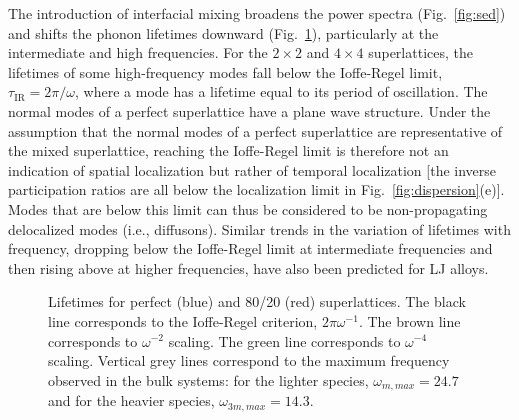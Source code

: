 \documentclass[aps,prb,preprint,preprintnumbers,amsmath,amssymb,floatfix,superscriptaddress]{revtex4}
\begin{document}
The introduction of interfacial mixing broadens the power spectra (Fig.~\ref{fig:sed}) and shifts the phonon lifetimes downward (Fig.~\ref{FIG:lifetime}), particularly at the intermediate and high frequencies. For the $2 \times 2$ and $ 4 \times 4$ superlattices,  the lifetimes of some high-frequency modes fall below the Ioffe-Regel limit, $\tau_\mathrm{IR} =2\pi/\omega$, where a mode has a lifetime equal to its period of oscillation. The normal modes of a perfect superlattice have a plane wave structure. Under the assumption that the normal modes of a perfect superlattice are representative of the mixed superlattice, reaching the Ioffe-Regel limit is therefore not an indication of spatial localization but rather of temporal localization [the inverse participation ratios are all below the localization limit in Fig.~\ref{fig:dispersion}(e)]. Modes that are below this limit can thus be considered to be non-propagating delocalized modes (i.e., diffusons).\cite{allen_thermal_1993,allen1999diffusons} Similar trends in the variation of lifetimes with frequency, dropping below the Ioffe-Regel limit at intermediate frequencies and then rising above at higher frequencies, have also been predicted for LJ alloys.\cite{jason2013vc} %

\renewcommand{\textfraction}{0.0}
\begin{figure}%
\begin{center}
\renewcommand{\figure}{Fig.}
\caption{Lifetimes for perfect (blue) and 80/20 (red) superlattices. The black line corresponds to the Ioffe-Regel criterion, $2\pi\omega^{-1}$. The brown line corresponds to $\omega^{-2}$ scaling. The green line corresponds to $\omega^{-4}$ scaling. Vertical grey lines correspond to the maximum frequency observed in the bulk systems: for the lighter species, $\omega_{m,max}=24.7$ and for the heavier species, $\omega_{3m,max}=14.3$. } 
\label{FIG:lifetime}
\end{center}
\end{figure}
\end{document}

